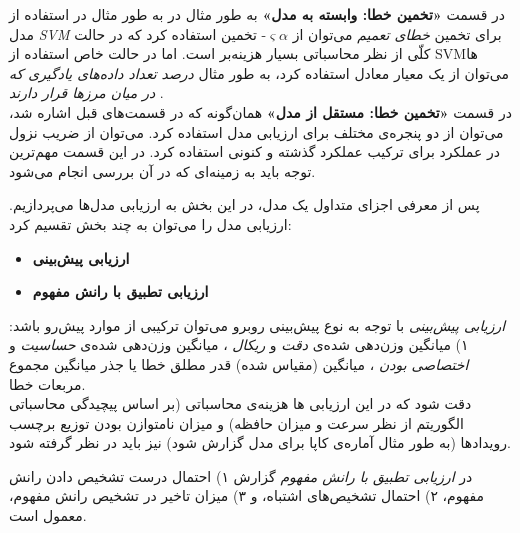 \vspace{5mm}
در قسمت 
\textbf{
«تخمین خطا: وابسته به مدل»
} 
به طور مثال در به طور مثال در استفاده از مدل 
\textit{
SVM
} 
برای تخمین 
\textit{
خطای تعمیم
} 
می‌توان از 
$\varsigma \alpha$-
تخمین استفاده کرد که در حالت کلّی از نظر محاسباتی بسیار هزینه‌بر است. اما در حالت خاص استفاده از 
SVMها 
می‌توان از یک معیار معادل استفاده کرد، به طور مثال 
\textit{
درصد تعداد داده‌های یادگیری که در میان مرزها قرار دارند
}.\\
در قسمت 
\textbf{
«تخمین خطا: مستقل از مدل»
} 
همان‌گونه که در قسمت‌های قبل اشاره شد، می‌توان از دو پنجره‌ی مختلف برای ارزیابی مدل استفاده کرد. می‌توان از ضریب نزول در عملکرد برای ترکیب عملکرد گذشته و کنونی استفاده کرد. در این قسمت مهم‌ترین توجه باید به زمینه‌ای که در آن بررسی انجام می‌شود.

\vspace{5mm}
پس از معرفی اجزای متداول یک مدل، در این بخش به ارزیابی مدل‌ها می‌پردازیم. ارزیابی مدل را می‌توان به چند بخش تقسیم کرد:
\begin{itemize}
\item \textbf{
ارزیابی پیش‌بینی
}

\item \textbf{
ارزیابی تطبیق با رانش مفهوم
}
\end{itemize}

\textit{
ارزیابی پیش‌بینی
} 
با توجه به نوع پیش‌بینی روبرو می‌توان ترکیبی از موارد پیش‌رو باشد: ۱) میانگین وزن‌دهی شده‌ی 
\textit{
دقت
} 
و 
\textit{
ریکال
}، 
میانگین وزن‌دهی شده‌ی 
\textit{
حساسیت
} 
و 
\textit{
اختصاصی بودن
}، 
میانگین (مقیاس شده) قدر مطلق خطا یا جذر میانگین مجموع مربعات خطا.\\
دقت شود که در این ارزیابی ها هزینه‌ی محاسباتی (بر اساس پیچیدگی محاسباتی الگوریتم از نظر سرعت و میزان حافظه) و میزان نامتوازن بودن توزیع برچسب رویدادها (به طور مثال آماره‌ی کاپا برای مدل گزارش شود) نیز باید در نظر گرفته شود.


در 
\textit{
ارزیابی تطبیق با رانش مفهوم
} 
گزارش ۱) احتمال درست تشخیص دادن رانش مفهوم، ۲) احتمال تشخیص‌های اشتباه، و ۳) میزان تاخیر در تشخیص رانش مفهوم، معمول است.


